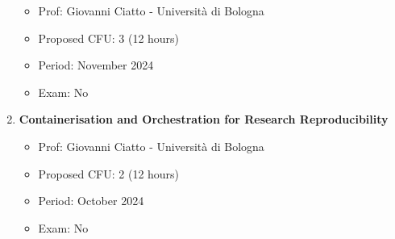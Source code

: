 \documentclass[runningheads]{llncs}
\begin{document}
\begin{enumerate}
    \begin{itemize}
        \item Prof: Giovanni Ciatto - Università di Bologna      
        \item Proposed CFU: 3 (12 hours) 
        \item Period: November 2024
        \item Exam: No
    \end{itemize} 
    \item \textbf{Containerisation and Orchestration for Research Reproducibility} 
    \begin{itemize}
        \item Prof: Giovanni Ciatto - Università di Bologna      
        \item Proposed CFU: 2 (12 hours) 
        \item Period: October 2024
        \item Exam: No
    \end{itemize} 
    
\end{enumerate}
%
%
%


%




\end{document}
